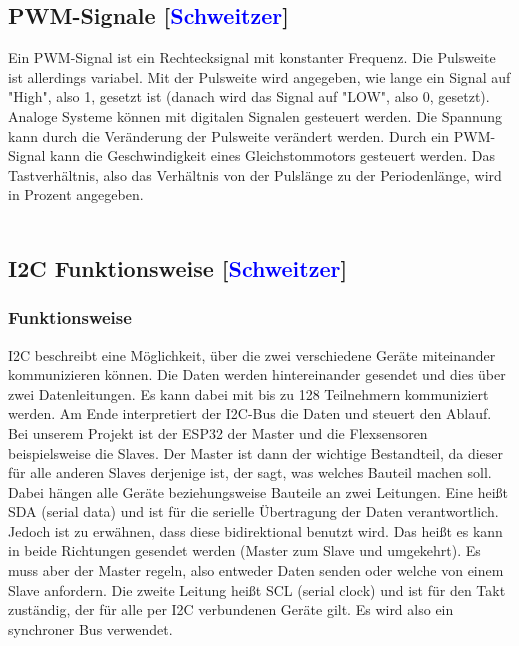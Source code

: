 \documentclass[titlepage,12pt,twoside]{article}
\begin{document}
\subsection{PWM-Signale [\textcolor{blue}{Schweitzer}]}
\label{chap:PWM-Signale}
Ein PWM-Signal ist ein Rechtecksignal mit konstanter Frequenz. Die Pulsweite ist allerdings variabel. Mit der Pulsweite wird angegeben, wie lange ein Signal auf 
"High", also 1, gesetzt ist (danach wird das Signal auf "LOW", also 0, gesetzt). Analoge Systeme können mit digitalen Signalen gesteuert werden. Die Spannung kann 
durch die Veränderung der Pulsweite verändert werden. Durch ein PWM-Signal kann die Geschwindigkeit eines Gleichstommotors gesteuert werden. Das Tastverhältnis, 
also das Verhältnis von der Pulslänge zu der Periodenlänge, wird in Prozent angegeben. \\
\\
\newpage
\subsection{I2C Funktionsweise [\textcolor{blue}{Schweitzer}]}
\label{chap:I2C Funktionsweise}
\subsubsection{Funktionsweise}
I2C beschreibt eine Möglichkeit, über die zwei verschiedene Geräte miteinander 
kommunizieren können. Die Daten werden hintereinander gesendet und dies über zwei 
Datenleitungen. Es kann dabei mit bis zu 128 Teilnehmern kommuniziert werden. Am Ende 
interpretiert der I2C-Bus die Daten und steuert den Ablauf. Bei unserem Projekt ist 
der ESP32 der Master und die Flexsensoren beispielsweise die Slaves. Der Master ist 
dann der wichtige Bestandteil, da dieser für alle anderen Slaves derjenige ist, der 
sagt, was welches Bauteil machen soll. Dabei hängen alle Geräte beziehungsweise 
Bauteile an zwei Leitungen. Eine heißt SDA (serial data) und ist für die serielle 
Übertragung der Daten verantwortlich. Jedoch ist zu erwähnen, dass diese bidirektional 
benutzt wird. Das heißt es kann in beide Richtungen gesendet werden (Master zum 
Slave und umgekehrt). Es muss aber der Master regeln, also entweder Daten senden 
oder welche von einem Slave anfordern. Die zweite Leitung heißt SCL (serial clock) 
und ist für den Takt zuständig, der für alle per I2C verbundenen Geräte gilt. Es 
wird also ein synchroner Bus verwendet. \\
\end{document}
